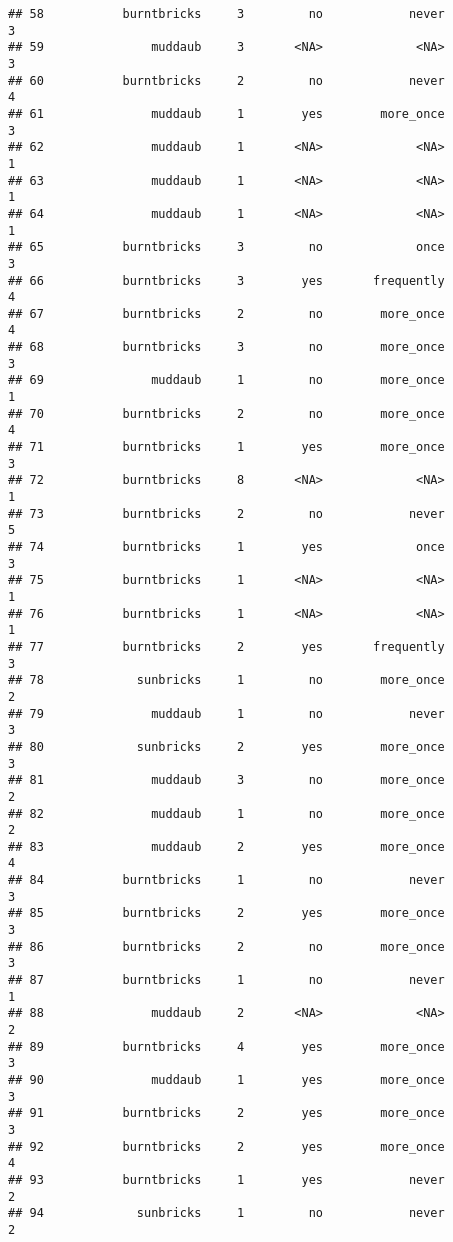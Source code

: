 \documentclass[
]{article}
\begin{document}
\begin{verbatim}
## 58           burntbricks     3         no            never         3
## 59               muddaub     3       <NA>             <NA>         3
## 60           burntbricks     2         no            never         4
## 61               muddaub     1        yes        more_once         3
## 62               muddaub     1       <NA>             <NA>         1
## 63               muddaub     1       <NA>             <NA>         1
## 64               muddaub     1       <NA>             <NA>         1
## 65           burntbricks     3         no             once         3
## 66           burntbricks     3        yes       frequently         4
## 67           burntbricks     2         no        more_once         4
## 68           burntbricks     3         no        more_once         3
## 69               muddaub     1         no        more_once         1
## 70           burntbricks     2         no        more_once         4
## 71           burntbricks     1        yes        more_once         3
## 72           burntbricks     8       <NA>             <NA>         1
## 73           burntbricks     2         no            never         5
## 74           burntbricks     1        yes             once         3
## 75           burntbricks     1       <NA>             <NA>         1
## 76           burntbricks     1       <NA>             <NA>         1
## 77           burntbricks     2        yes       frequently         3
## 78             sunbricks     1         no        more_once         2
## 79               muddaub     1         no            never         3
## 80             sunbricks     2        yes        more_once         3
## 81               muddaub     3         no        more_once         2
## 82               muddaub     1         no        more_once         2
## 83               muddaub     2        yes        more_once         4
## 84           burntbricks     1         no            never         3
## 85           burntbricks     2        yes        more_once         3
## 86           burntbricks     2         no        more_once         3
## 87           burntbricks     1         no            never         1
## 88               muddaub     2       <NA>             <NA>         2
## 89           burntbricks     4        yes        more_once         3
## 90               muddaub     1        yes        more_once         3
## 91           burntbricks     2        yes        more_once         3
## 92           burntbricks     2        yes        more_once         4
## 93           burntbricks     1        yes            never         2
## 94             sunbricks     1         no            never         2

\end{verbatim}
\end{document}

